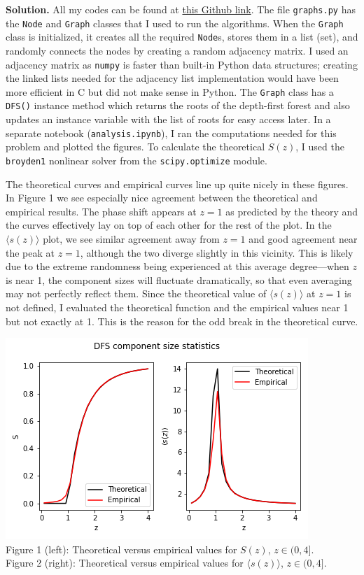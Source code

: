\documentclass{letter}
\newcounter{problem}
\newcommand{\Solution}[1]{%
	\textbf{Solution.} #1 \par%
}
\begin{document}
    \Solution{All my codes can be found at \href{https://github.com/thoffman1/amsc808n/tree/master/hws/hw6}{this Github link}. The file \texttt{graphs.py} has the \texttt{Node} and \texttt{Graph} classes that I used to run the algorithms. When the \texttt{Graph} class is initialized, it creates all the required \texttt{Node}s, stores them in a list (set), and randomly connects the nodes by creating a random adjacency matrix. I used an adjacency matrix as \texttt{numpy} is faster than built-in Python data structures; creating the linked lists needed for the adjacency list implementation would have been more efficient in C but did not make sense in Python. The \texttt{Graph} class has a \texttt{DFS()} instance method which returns the roots of the depth-first forest and also updates an instance variable with the list of roots for easy access later. In a separate notebook (\texttt{analysis.ipynb}), I ran the computations needed for this problem and plotted the figures. To calculate the theoretical $S(z)$, I used the \texttt{broyden1} nonlinear solver from the \texttt{scipy.optimize} module.

    The theoretical curves and empirical curves line up quite nicely in these figures. In Figure 1 we see especially nice agreement between the theoretical and empirical results. The phase shift appears at $z = 1$ as predicted by the theory and the curves effectively lay on top of each other for the rest of the plot. In the $\langle s(z) \rangle$ plot, we see similar agreement away from $z = 1$ and good agreement near the peak at $z = 1$, although the two diverge slightly in this vicinity. This is likely due to the extreme randomness being experienced at this average degree---when $z$ is near 1, the component sizes will fluctuate dramatically, so that even averaging may not perfectly reflect them. Since the theoretical value of $\langle s(z) \rangle$ at $z = 1$ is not defined, I evaluated the theoretical function and the empirical values near 1 but not exactly at 1. This is the reason for the odd break in the theoretical curve.

    \begin{center} 
        \includegraphics{../code/dfsstats.png} \\
        Figure 1 (left): Theoretical versus empirical values for $S(z)$, $z \in (0, 4]$. \\
        Figure 2 (right): Theoretical versus empirical values for $\langle s(z) \rangle$, $z \in (0, 4]$.
    \end{center}}
\end{document}
